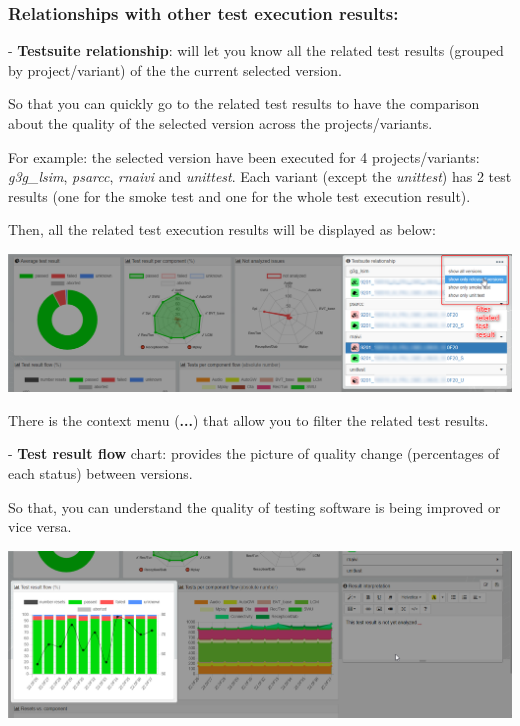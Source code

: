 \subsubsection{Relationships with other test execution results:}

- \textbf{Testsuite relationship}: will let you know all the related test 
results (grouped by project/variant) of the the current selected version.

So that you can quickly go to the related test results to have the comparison
about the quality of the selected version across the projects/variants.

For example: the selected version have been executed for 4 projects/variants:
\emph{g3g\_lsim}, \emph{psarcc}, \emph{rnaivi} and \emph{unittest}. Each 
variant (except the \emph{unittest}) has 2 test results 
(one for the smoke test and one for the whole test execution result).

Then, all the related test execution results will be displayed as below:

\includegraphics[width=1\linewidth]
{./pictures/dashboard/testsuite_relationship.png}

There is the context menu (\textbf{...}) that allow you to filter the related 
test results.

- \textbf{Test result flow} chart: provides the picture of quality change 
(percentages of each status) between versions. 

So that, you can understand the quality of testing software is being improved 
or vice versa.

\includegraphics[width=1\linewidth]
{./pictures/dashboard/chart_test_result_flow.png}

